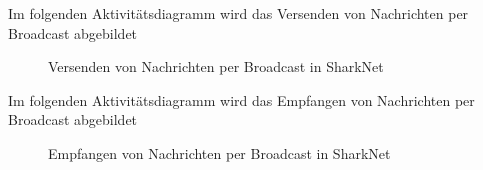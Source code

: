 \newpage

Im folgenden Aktivitätsdiagramm wird das Versenden von Nachrichten per Broadcast abgebildet
\begin{figure}[H]
	\centering
	\hspace*{1cm}
	\caption{Versenden von Nachrichten per Broadcast in SharkNet}
	\label{fig:broadcastSend}
\end{figure}

\newpage

Im folgenden Aktivitätsdiagramm wird das Empfangen von Nachrichten per Broadcast abgebildet
\begin{figure}[H]
	\centering
	\hspace*{1cm}
	\caption{Empfangen von Nachrichten per Broadcast in SharkNet}
	\label{fig:broadcastReceive}
\end{figure}

